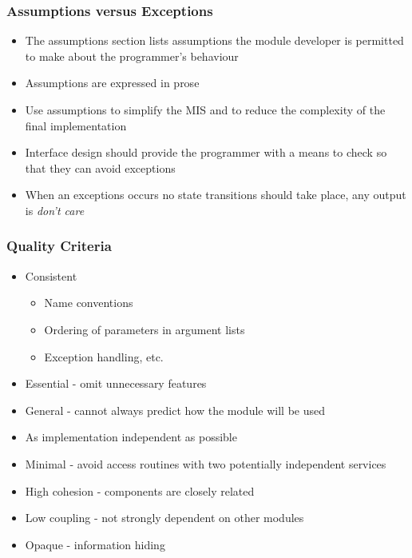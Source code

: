 \documentclass[t,12pt,numbers,fleqn]{beamer}
\begin{document}

\begin{frame}

\frametitle{Assumptions versus Exceptions}

\begin{itemize}
\item The assumptions section lists assumptions the module developer is permitted to make about the programmer's behaviour
\item Assumptions are expressed in prose
\item Use assumptions to simplify the MIS and to reduce the complexity of the final implementation
\item Interface design should provide the programmer with a means to check so that they can avoid exceptions
\item When an exceptions occurs no state transitions should take place, any output is {\it don't care}
\end{itemize}

\end{frame}


\begin{frame}

\frametitle{Quality Criteria}

\begin{itemize}
\item Consistent
\begin{itemize}
\item Name conventions
\item Ordering of parameters in argument lists
\item Exception handling, etc.
\end{itemize}
\item Essential - omit unnecessary features
\item General - cannot always predict how the module will be used
\item As implementation independent as possible
\item Minimal - avoid access routines with two potentially independent services
\item High cohesion - components are closely related
\item Low coupling - not strongly dependent on other modules
\item Opaque - information hiding
\end{itemize}

\end{frame}
\end{document}

